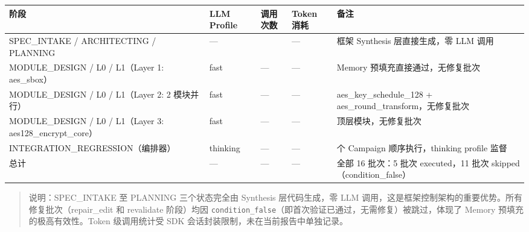 {\def\LTcaptype{none} %
\begin{longtable}[]{@{}
  >{\raggedright\arraybackslash}p{}
  >{\raggedright\arraybackslash}p{}
  >{\raggedright\arraybackslash}p{}
  >{\raggedright\arraybackslash}p{}
  >{\raggedright\arraybackslash}p{}@{}}
\toprule\noalign{}
\begin{minipage}[b]{\linewidth}\raggedright
阶段
\end{minipage} & \begin{minipage}[b]{\linewidth}\raggedright
LLM Profile
\end{minipage} & \begin{minipage}[b]{\linewidth}\raggedright
调用次数
\end{minipage} & \begin{minipage}[b]{\linewidth}\raggedright
Token 消耗
\end{minipage} & \begin{minipage}[b]{\linewidth}\raggedright
备注
\end{minipage} \\
\midrule\noalign{}
\endhead
\bottomrule\noalign{}
\endlastfoot
SPEC\_INTAKE / ARCHITECTING / PLANNING & --- & 0 & --- & 框架 Synthesis
层直接生成，零 LLM 调用 \\
MODULE\_DESIGN / L0 / L1（Layer 1: aes\_sbox） & fast & --- & --- &
Memory 预填充直接通过，无修复批次 \\
MODULE\_DESIGN / L0 / L1（Layer 2: 2 模块并行） & fast & --- & --- &
aes\_key\_schedule\_128 + aes\_round\_transform，无修复批次 \\
MODULE\_DESIGN / L0 / L1（Layer 3: aes128\_encrypt\_core） & fast & ---
& --- & 顶层模块，无修复批次 \\
INTEGRATION\_REGRESSION（编排器） & thinking & --- & --- & 3 个 Campaign
顺序执行，thinking profile 监督 \\
总计 & --- & --- & --- & 全部 16 批次：5 批次 executed，11 批次
skipped（condition\_false） \\
\end{longtable}
}

\begin{quote}
说明：SPEC\_INTAKE 至 PLANNING 三个状态完全由 Synthesis 层代码生成，零
LLM 调用，这是框架控制架构的重要优势。所有修复批次（repair\_edit 和
revalidate 阶段）均因
\texttt{condition\_false}（即首次验证已通过，无需修复）被跳过，体现了
Memory 预填充的极高有效性。Token 级调用统计受 SDK
会话封装限制，未在当前报告中单独记录。
\end{quote}

